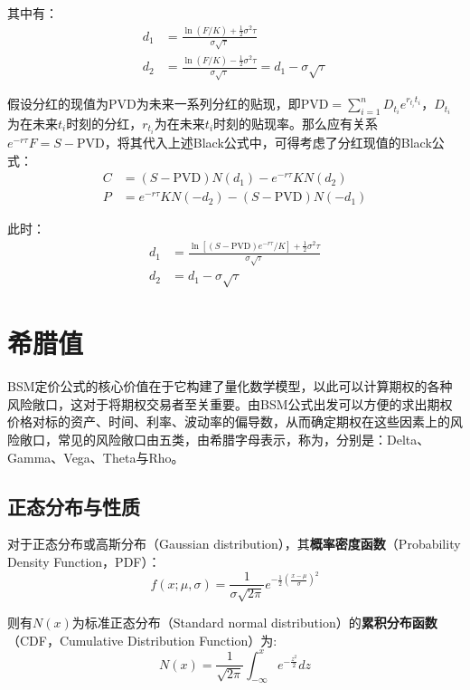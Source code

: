 \documentclass[11pt]{article}
\begin{document}
其中有：
\begin{align*}
    d_1 &= \frac{\ln(F/K) + \frac{1}{2} \sigma^2 \tau}{\sigma \sqrt{\tau}} \\
    d_2 &= \frac{\ln(F/K) - \frac{1}{2} \sigma^2 \tau}{\sigma \sqrt{\tau}}
    = d_1 - \sigma \sqrt{\tau}
\end{align*}

假设分红的现值为PVD为未来一系列分红的贴现，即$\text{PVD} = \sum_{i=1}^{n} D_{t_i} e^{r_{t_i} t_i}$，$D_{t_i}$为在未来$t_i$时刻的分红，$r_{t_i}$为在未来$t_i$时刻的贴现率。那么应有关系$e^{-r\tau}F = S-\text{PVD}$，将其代入上述Black公式中，可得考虑了分红现值的Black公式：
\begin{align*}
    C &= \left(S-\text{PVD}\right) N(d_1) - e^{-r\tau} KN(d_2) \\
    P &= e^{-r\tau}KN(-d_2) - \left(S-\text{PVD}\right) N(-d_1)
\end{align*}

此时：
\begin{align*}
    d_1 &= \frac{\ln\left[\left( S-\text{PVD} \right) e^{-r\tau} /K\right] + \frac{1}{2} \sigma^2 \tau}{\sigma \sqrt{\tau}} \\
    d_2 &= d_1 - \sigma \sqrt{\tau}
\end{align*}

\section{希腊值}

BSM定价公式的核心价值在于它构建了量化数学模型，以此可以计算期权的各种风险敞口，这对于将期权交易者至关重要。由BSM公式出发可以方便的求出期权价格对标的资产、时间、利率、波动率的偏导数，从而确定期权在这些因素上的风险敞口，常见的风险敞口由五类，由希腊字母表示，称为，分别是：Delta、Gamma、Vega、Theta与Rho。

\subsection{正态分布与性质}

对于正态分布或高斯分布（Gaussian distribution），其\textbf{概率密度函数}（Probability Density Function，PDF）：
\begin{equation*}
    f(x;\mu,\sigma) = \frac{1}{\sigma\sqrt{2\pi}} e^{-\frac{1}{2}\left(\frac{x-\mu}{\sigma} \right)^2}
\end{equation*}

则有$N(x)$为标准正态分布（Standard normal distribution）的\textbf{累积分布函数}（CDF，Cumulative Distribution Function）为:
\begin{equation*}
    N(x) = \frac{1}{\sqrt{2\pi}} \int_{-\infty}^{x}e^{-\frac{z^2}{2}}dz
\end{equation*}
\end{document}
